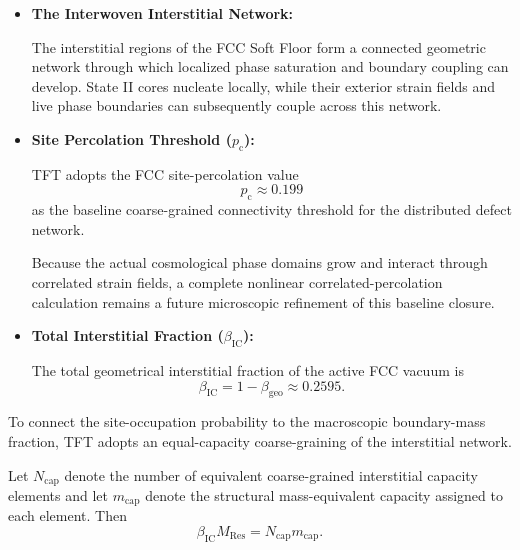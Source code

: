 \begin{itemize}

    \item \textbf{The Interwoven Interstitial Network:}

    The interstitial regions of the FCC Soft Floor form a connected geometric
    network through which localized phase saturation and boundary coupling can
    develop. State II cores nucleate locally, while their exterior strain
    fields and live phase boundaries can subsequently couple across this
    network.

    \item \textbf{Site Percolation Threshold (\(p_{\mathrm c}\)):}

    TFT adopts the FCC site-percolation value
    \begin{equation}
        p_{\mathrm c}
        \approx
        0.199
    \end{equation}
    as the baseline coarse-grained connectivity threshold for the distributed
    defect network.

    Because the actual cosmological phase domains grow and interact through
    correlated strain fields, a complete nonlinear correlated-percolation
    calculation remains a future microscopic refinement of this baseline
    closure.

    \item \textbf{Total Interstitial Fraction (\(\beta_{\mathrm{IC}}\)):}

    The total geometrical interstitial fraction of the active FCC vacuum is
    \begin{equation}
        \beta_{\mathrm{IC}}
        =
        1-\beta_{\mathrm{geo}}
        \approx
        0.2595.
    \end{equation}

\end{itemize}

To connect the site-occupation probability to the macroscopic boundary-mass
fraction, TFT adopts an equal-capacity coarse-graining of the interstitial
network.

Let \(N_{\mathrm{cap}}\) denote the number of equivalent coarse-grained
interstitial capacity elements and let \(m_{\mathrm{cap}}\) denote the
structural mass-equivalent capacity assigned to each element. Then
\begin{equation}
    \beta_{\mathrm{IC}}
    M_{\mathrm{Res}}
    =
    N_{\mathrm{cap}}
    m_{\mathrm{cap}}.
\end{equation}

